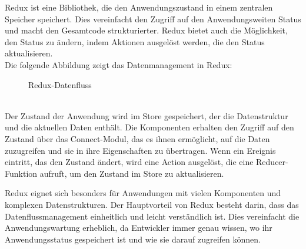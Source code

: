Redux ist eine Bibliothek, die den Anwendungszustand in einem zentralen Speicher speichert. Dies vereinfacht den Zugriff auf den Anwendungsweiten Status und macht den Gesamtcode strukturierter. Redux bietet auch die Möglichkeit, den Status zu ändern, indem Aktionen ausgelöst werden, die den Status aktualisieren.\cite{scalablepath} \\
Die folgende Abbildung zeigt das Datenmanagement in Redux:
\begin{figure}[htbp]
	\centering
	\caption{Redux-Datenfluss}
\end{figure}\\
Der Zustand der Anwendung wird im Store gespeichert, der die Datenstruktur und die aktuellen Daten enthält. Die Komponenten erhalten den Zugriff auf den Zustand über das Connect-Modul, das es ihnen ermöglicht, auf die Daten zuzugreifen und sie in ihre Eigenschaften zu übertragen. Wenn ein Ereignis eintritt, das den Zustand ändert, wird eine Action ausgelöst, die eine Reducer-Funktion aufruft, um den Zustand im Store zu aktualisieren.

Redux eignet sich besonders für Anwendungen mit vielen Komponenten und komplexen Datenstrukturen. Der Hauptvorteil von Redux besteht darin, dass das Datenflussmanagement einheitlich und leicht verständlich ist. Dies vereinfacht die Anwendungswartung erheblich, da Entwickler immer genau wissen, wo ihr Anwendungsstatus gespeichert ist und wie sie darauf zugreifen können.

